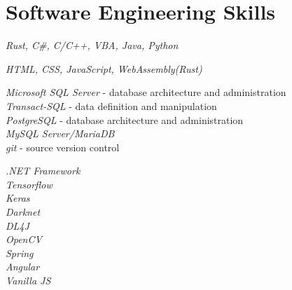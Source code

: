 \documentclass[10pt]{article} %
\begin{document}




\section{Software Engineering Skills}

{
\textit{Rust, C\#, C/C++, VBA, Java, Python}\\
}


{
\textit{HTML, CSS, JavaScript, WebAssembly(Rust)}\\
}


{
\textit{Microsoft SQL Server} - database architecture and administration\\
\textit{Transact-SQL} - data definition and manipulation\\
\textit{PostgreSQL} - database architecture and administration\\
\textit{MySQL Server/MariaDB}\\
\textit{git} - source version control
}


{
\textit{.NET Framework}\\
\textit{Tensorflow}\\
\textit{Keras}\\
\textit{Darknet}\\
\textit{DL4J}\\
\textit{OpenCV}\\
\textit{Spring}\\
\textit{Angular}\\
\textit{Vanilla JS}\\
}
\end{document}
